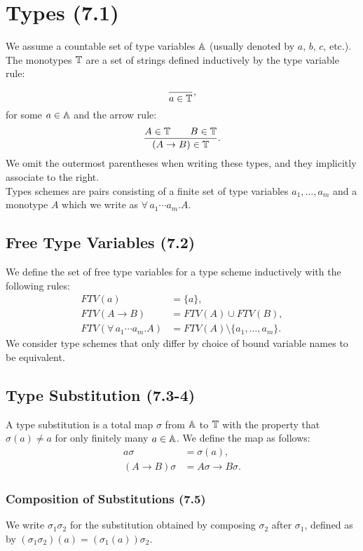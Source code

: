 \section{Types (7.1)}

We assume a countable set of type variables $\mathbb{A}$ (usually
denoted by $a$, $b$, $c$, etc.). The monotypes $\mathbb{T}$ are a
set of strings defined inductively by the type variable rule:
\begin{align*}
    \frac{}{a \in \mathbb{T}},
\end{align*} for some $a \in \mathbb{A}$ and the arrow rule: \begin{align*}
    \frac{A \in \mathbb{T} \qquad B \in \mathbb{T}}{(A \to B) \in \mathbb{T}}.
\end{align*} We omit the outermost parentheses when writing these
types, and they implicitly associate to the right.
\\[\baselineskip]
Types schemes are pairs consisting of a finite set of type
variables $a_1, \ldots, a_m$ and a monotype $A$ which we
write as $\forall \, a_1 \cdots a_m.A$.

\subsection{Free Type Variables (7.2)}

We define the set of free type variables for a type scheme
inductively with the following rules: \begin{align*}
    FTV(a) &= \{a\}, \\
    FTV(A \to B) &= FTV(A) \cup FTV(B), \\
    FTV(\forall \, a_1 \cdots a_m.A) &= FTV(A) \setminus \{a_1, \ldots, a_m\}.
\end{align*} We consider type schemes that only differ by choice
of bound variable names to be equivalent.

\subsection{Type Substitution (7.3-4)}

A type substitution is a total map $\sigma$ 
from $\mathbb{A}$ to 
$\mathbb{T}$ with the property that $\sigma(a) \neq a$ for only
finitely many $a \in \mathbb{A}$. We define the map as follows:
\begin{align*}
    a\sigma &= \sigma(a), \\
    (A \to B)\sigma &= A\sigma \to B\sigma.
\end{align*}

\subsubsection{Composition of Substitutions (7.5)}

We write $\sigma_1\sigma_2$ for the substitution obtained by
composing $\sigma_2$ after $\sigma_1$, defined as by
$(\sigma_1\sigma_2)(a) = (\sigma_1(a))\sigma_2$.
